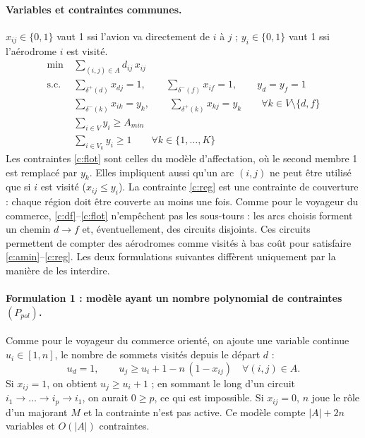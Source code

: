 \documentclass[11pt]{article}
\begin{document}
\paragraph{Variables et contraintes communes.} $x_{ij}\in\{0,1\}$ vaut 1 ssi l'avion va
directement de $i$ à $j$ ; $y_i\in\{0,1\}$ vaut 1 ssi l'aérodrome $i$ est visité.
\begin{align}
\min\ & \sum_{(i,j)\in A} d_{ij}\,x_{ij} \nonumber\\
\text{s.c.}\ & \textstyle\sum_{\delta^+(d)} x_{dj}=1,\qquad \sum_{\delta^-(f)} x_{if}=1,\qquad y_d=y_f=1 \label{c:df}\\
& \textstyle\sum_{\delta^-(k)} x_{ik}=y_k,\qquad \sum_{\delta^+(k)} x_{kj}=y_k \qquad \forall k\in V\setminus\{d,f\} \label{c:flot}\\
& \textstyle\sum_{i\in V} y_i\ge A_{min} \label{c:amin}\\
& \textstyle\sum_{i\in V_k} y_i\ge 1 \qquad \forall k\in\{1,\dots,K\} \label{c:reg}
\end{align}
Les contraintes \eqref{c:flot} sont celles du modèle d'affectation, où le second
membre 1 est remplacé par $y_k$. Elles impliquent aussi qu'un arc $(i,j)$ ne peut être utilisé
que si $i$ est visité ($x_{ij}\le y_i$).
La contrainte \eqref{c:reg} est une contrainte de couverture : chaque région
doit être couverte au moins une fois. Comme pour le voyageur du commerce,
\eqref{c:df}--\eqref{c:flot} n'empêchent pas les sous-tours : les arcs choisis forment
un chemin $d\to f$ et, éventuellement, des circuits disjoints. Ces circuits permettent
de compter des aérodromes comme visités à bas coût pour satisfaire \eqref{c:amin}--\eqref{c:reg}.
Les deux formulations suivantes diffèrent uniquement par la manière de les interdire.

\paragraph{Formulation 1 : modèle ayant un nombre polynomial de contraintes $(P_{pol})$.}
Comme pour le voyageur du commerce orienté, on ajoute une variable continue $u_i\in[1,n]$, le nombre de sommets
visités depuis le départ $d$ :
\begin{equation}
u_d=1,\qquad u_j\ge u_i+1-n\,(1-x_{ij})\quad \forall (i,j)\in A. \label{c:pol}
\end{equation}
Si $x_{ij}=1$, on obtient $u_j\ge u_i+1$ ; en sommant le long d'un circuit
$i_1\to\dots\to i_p\to i_1$, on aurait $0\ge p$, ce qui est impossible. Si $x_{ij}=0$,
$n$ joue le rôle d'un majorant $M$ et la contrainte n'est pas active. Ce modèle
compte $|A|+2n$ variables et $O(|A|)$ contraintes.
\end{document}
